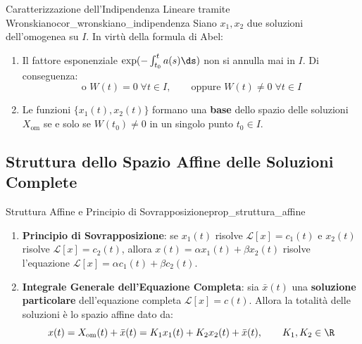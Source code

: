 \begin{corollario}{Caratterizzazione dell'Indipendenza Lineare tramite Wronskiano}{cor_wronskiano_indipendenza}
Siano $x_1, x_2$ due soluzioni dell'omogenea su $I$. In virtù della formula di Abel:
\begin{enumerate}
    \item Il fattore esponenziale $\exp(-\int_{t_0}^t a(s)\ds)$ non si annulla mai in $I$. Di conseguenza:
    \[
        \text{o } W(t) = 0 \; \forall t \in I, \qquad \text{oppure } W(t) \neq 0 \; \forall t \in I
    \]
    \item Le funzioni $\{x_1(t), x_2(t)\}$ formano una \textbf{base} dello spazio delle soluzioni $X_{\text{om}}$ se e solo se $W(t_0) \neq 0$ in un singolo punto $t_0 \in I$.
\end{enumerate}
\end{corollario}

\subsection{Struttura dello Spazio Affine delle Soluzioni Complete}

\begin{proposizione}{Struttura Affine e Principio di Sovrapposizione}{prop_struttura_affine}
\begin{enumerate}
    \item \textbf{Principio di Sovrapposizione}: se $x_1(t)$ risolve $\mathcal{L}[x] = c_1(t)$ e $x_2(t)$ risolve $\mathcal{L}[x] = c_2(t)$, allora $x(t) = \alpha x_1(t) + \beta x_2(t)$ risolve l'equazione $\mathcal{L}[x] = \alpha c_1(t) + \beta c_2(t)$.
    \item \textbf{Integrale Generale dell'Equazione Completa}: sia $\bar{x}(t)$ una \textbf{soluzione particolare} dell'equazione completa $\mathcal{L}[x] = c(t)$. Allora la totalità delle soluzioni è lo spazio affine dato da:
    \begin{equation}
        \label{eq:struttura_affine}
        x(t) = X_{\text{om}}(t) + \bar{x}(t) = K_1 x_1(t) + K_2 x_2(t) + \bar{x}(t), \qquad K_1, K_2 \in \R
    \end{equation}
\end{enumerate}
\end{proposizione}

\newpage

